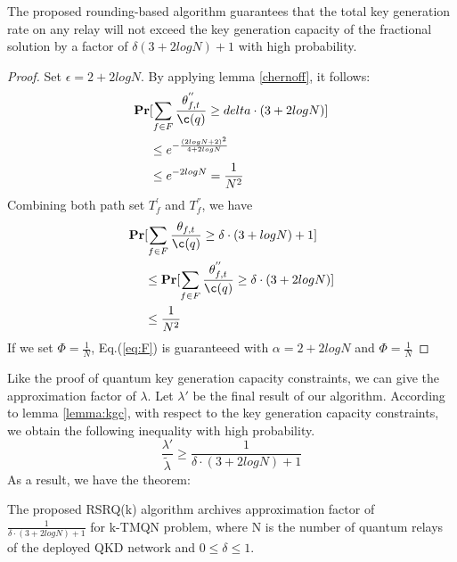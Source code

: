 {\begin{lemma}\label{lemma:kgc}
	The proposed rounding-based algorithm guarantees that the total key generation rate on any relay will not exceed the key generation capacity of the fractional solution by a factor of $\delta(3+2logN)+1$ with high probability.
	\begin{proof}
		Set $\epsilon = 2 + 2logN$. By applying lemma \ref{chernoff}, it follows:
		\begin{equation}
		\begin{aligned}
		\textbf{Pr}&[\sum_{f \in F} \frac{\theta^{''}_{f,t}}{\c(q)} \ge  delta \cdot (3+2logN)] \\
		& \le e^{-\frac{(2logN+2)^2}{4+2logN}} \\
		& \le  e^{-2logN} = \frac{1}{N^2} 
		\end{aligned}
		\end{equation}
		Combining both path set $T^{'}_f$ and $T^{''}_f$, we have 
		\begin{equation}
		\begin{aligned}
		\textbf{Pr}&[\sum_{f \in F} \frac{\theta_{f,t}}{\c(q)} \ge  \delta \cdot (3+logN) + 1] \\
		& \le \textbf{Pr}[\sum_{f \in F} \frac{\theta^{''}_{f,t}}{\c(q)} \ge  \delta \cdot (3+2logN)] \\
		& \le \frac{1}{N^2} 
		\end{aligned}
		\end{equation}
		If we set $\Phi = \frac{1}{N}$, Eq.(\ref{eq:F}) is guaranteeed with $\alpha = 2 + 2logN$ and $\Phi = \frac{1}{N}$
	\end{proof}
\end{lemma}

Like the proof of quantum key generation capacity constraints, we can give the approximation factor of $\lambda$. Let $\lambda'$ be the final result of our algorithm. According to lemma \ref{lemma:kgc}, with respect to the key generation capacity constraints, we obtain the following inequality with high probability.
\begin{equation}
	\frac{\lambda'}{\widetilde{\lambda}} \ge \frac{1}{\delta \cdot (3+2logN)+1}
\end{equation}
As a result, we have the theorem:
\begin{theorem}
	The proposed RSRQ(k) algorithm archives approximation factor of $\frac{1}{\delta \cdot (3+2logN)+1}$ for k-TMQN problem, where N is the number of quantum relays of the deployed QKD network and $0 \le \delta \le 1$.
\end{theorem}


}
